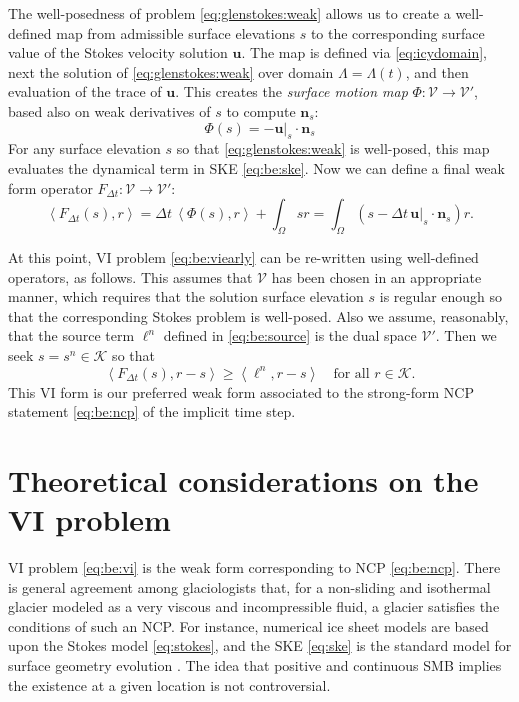 \documentclass[hidelinks,onefignum,onetabnum,final]{siamart220329}  %
\newcommand{\bn}{\mathbf{n}}
\newcommand{\bu}{\mathbf{u}}
\newcommand{\cK}{\mathcal{K}}
\newcommand{\cV}{\mathcal{V}}
\newcommand{\ip}[2]{\left<#1,#2\right>}
\begin{document}
The well-posedness of problem \eqref{eq:glenstokes:weak} allows us to create a well-defined map from admissible surface elevations $s$ to the corresponding surface value of the Stokes velocity solution $\bu$.  The map is defined via \eqref{eq:icydomain}, next the solution of \eqref{eq:glenstokes:weak} over domain $\Lambda=\Lambda(t)$, and then evaluation of the trace of $\bu$.  This creates the \emph{surface motion map} $\Phi:\cV \to \cV'$, based also on weak derivatives of $s$ to compute $\bn_s$:
\begin{equation}
\Phi(s) = - \bu|_s\cdot \bn_s \label{eq:be:Phidefine}
\end{equation}
For any surface elevation $s$ so that \eqref{eq:glenstokes:weak} is well-posed, this map evaluates the dynamical term in SKE \eqref{eq:be:ske}.  Now we can define a final weak form operator $F_{\Delta t}:\cV\to\cV'$:
\begin{equation}
\ip{F_{\Delta t}(s)}{r} = \Delta t\,\ip{\Phi(s)}{r} + \int_\Omega s r = \int_\Omega \left(s - \Delta t\, \bu|_s \cdot \bn_s\right) r.  \label{eq:be:Fdefine}
\end{equation}

At this point, VI problem \eqref{eq:be:viearly} can be re-written using well-defined operators, as follows.  This assumes that $\cV$ has been chosen in an appropriate manner, which requires that the solution surface elevation $s$ is regular enough so that the corresponding Stokes problem is well-posed.  Also we assume, reasonably, that the source term $\ell^n$ defined in \eqref{eq:be:source} is the dual space $\cV'$.  Then we seek $s = s^n \in \cK$ so that
\begin{equation}
\ip{F_{\Delta t}(s)}{r-s} \ge \ip{\ell^n}{r-s} \quad \text{for all } r \in \cK. \label{eq:be:vi}
\end{equation}
This VI form is our preferred weak form associated to the strong-form NCP statement \eqref{eq:be:ncp} of the implicit time step.


\section{Theoretical considerations on the VI problem} \label{sec:theory}

VI problem \eqref{eq:be:vi} is the weak form corresponding to NCP \eqref{eq:be:ncp}.  There is general agreement among glaciologists that, for a non-sliding and isothermal glacier modeled as a very viscous and incompressible fluid, a glacier satisfies the conditions of such an NCP.  For instance, numerical ice sheet models \cite{IsaacStadlerGhattas2015,WirbelJarosch2020} are based upon the Stokes model \eqref{eq:stokes}, and the SKE \eqref{eq:ske} is the standard model for surface geometry evolution \cite{GreveBlatter2009,SchoofHewitt2013}.  The idea that positive and continuous SMB implies the existence at a given location is not controversial.
\end{document}

